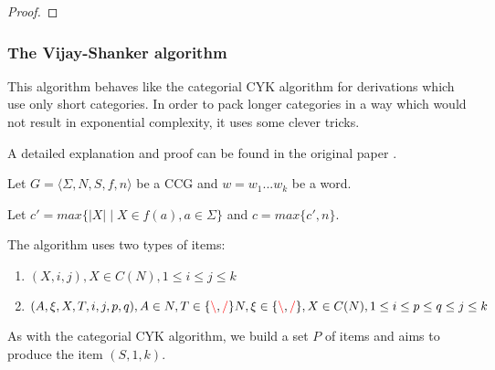\documentclass[main.tex]{subfiles}
\begin{document}
\begin{proof}
\end{proof}

\subsubsection{The Vijay-Shanker algorithm}

This algorithm behaves like the categorial CYK algorithm for derivations which use only
short categories. In order to pack longer categories in a way which would not
result in exponential complexity, it uses some clever tricks.

A detailed explanation and proof can be found in the original paper \cite{shanker}.

Let $ G = \langle \Sigma, N, S, f, n \rangle $ be a CCG and $w = w_1 ... w_k$
be a word.

Let $c' = max \{ |X| \mid X \in f(a), a \in \Sigma \}$ and $c = max \{ c', n \}$.

The algorithm uses two types of items:
\begin{enumerate}
    \item $(X, i, j), X \in C(N), 1 \leq i \leq j \leq k$
    \item $(A, \xi, X, T, i, j, p, q), A \in N, T \in \{ \textcolor{red}{\backslash}, \textcolor{red}{/} \} N, \xi \in \{ \textcolor{red}{\backslash}, \textcolor{red}{/} \}, X \in C(N), 1 \leq i \leq p \leq q \leq j \leq k$
\end{enumerate}

As with the categorial CYK algorithm, we build a set ${P}$ of items and aims to produce the item
$(S, 1, k)$.
\end{document}
